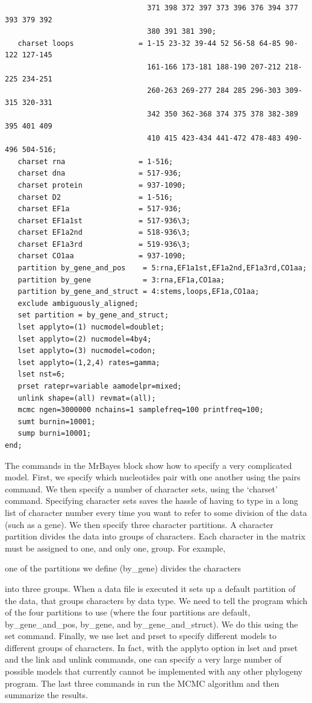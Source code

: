 \documentclass{svmult}
\begin{document}
\begin{verbatim}
                                 371 398 372 397 373 396 376 394 377 393 379 392 
                                 380 391 381 390;
   charset loops               = 1-15 23-32 39-44 52 56-58 64-85 90-122 127-145 
                                 161-166 173-181 188-190 207-212 218-225 234-251 
                                 260-263 269-277 284 285 296-303 309-315 320-331 
                                 342 350 362-368 374 375 378 382-389 395 401 409 
                                 410 415 423-434 441-472 478-483 490-496 504-516;
   charset rna                 = 1-516;
   charset dna                 = 517-936;
   charset protein             = 937-1090;
   charset D2                  = 1-516;
   charset EF1a                = 517-936;
   charset EF1a1st             = 517-936\3;
   charset EF1a2nd             = 518-936\3;
   charset EF1a3rd             = 519-936\3;
   charset CO1aa               = 937-1090;
   partition by_gene_and_pos    = 5:rna,EF1a1st,EF1a2nd,EF1a3rd,CO1aa;
   partition by_gene            = 3:rna,EF1a,CO1aa;
   partition by_gene_and_struct = 4:stems,loops,EF1a,CO1aa;
   exclude ambiguously_aligned;
   set partition = by_gene_and_struct;
   lset applyto=(1) nucmodel=doublet;
   lset applyto=(2) nucmodel=4by4;
   lset applyto=(3) nucmodel=codon;
   lset applyto=(1,2,4) rates=gamma;
   lset nst=6;
   prset ratepr=variable aamodelpr=mixed;
   unlink shape=(all) revmat=(all);
   mcmc ngen=3000000 nchains=1 samplefreq=100 printfreq=100;
   sumt burnin=10001;
   sump burni=10001;
end;
\end{verbatim}
\normalsize
The commands in the MrBayes block show how to specify a very complicated model. 
First, we specify which nucleotides pair with one
another using the pairs command. We then specify a number of character sets, 
using the `charset' command. Specifying character
sets saves the hassle of having to type in a long list of character number 
every time you want to refer to some division of the data (such as
a gene). We then specify three character partitions. A character 
partition divides the data into groups of characters. Each character in
the matrix must be assigned to one, and only one, group. For example, 

one of the partitions we define (by\_gene) divides  the characters

into three groups. When a data file is executed it sets up a default partition of the data, that groups characters by data type. We need to tell
the program which of the four partitions to use (where the four partitions are default, by\_gene\_and\_pos, by\_gene, and by\_gene\_and\_struct). We
do this using the set command. Finally, we use lset and prset to specify different models to different groups of characters. In fact, with the applyto option
in lset and prset and the link and unlink commands, one can specify a very large number of possible models that currently cannot be implemented with
any other phylogeny program. The last three commands in run the MCMC algorithm and then summarize the results.
\end{document}
